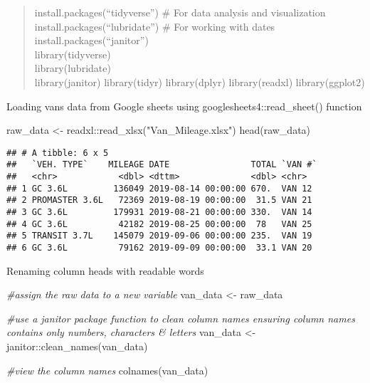 \documentclass[
]{article}
\newenvironment{Shaded}{\begin{snugshade}}{\end{snugshade}}
\newcommand{\CommentTok}[1]{\textcolor[rgb]{0.56,0.35,0.01}{\textit{#1}}}
\newcommand{\FunctionTok}[1]{\textcolor[rgb]{0.00,0.00,0.00}{#1}}
\newcommand{\NormalTok}[1]{#1}
\newcommand{\OtherTok}[1]{\textcolor[rgb]{0.56,0.35,0.01}{#1}}
\newcommand{\SpecialCharTok}[1]{\textcolor[rgb]{0.00,0.00,0.00}{#1}}
\newcommand{\StringTok}[1]{\textcolor[rgb]{0.31,0.60,0.02}{#1}}
\begin{document}
\begin{quote}
install.packages(``tidyverse'') \# For data analysis and visualization\\
install.packages(``lubridate'') \# For working with dates\\
install.packages(``janitor'')\\
library(tidyverse)\\
library(lubridate)\\
library(janitor) library(tidyr) library(dplyr) library(readxl)
library(ggplot2)
\end{quote}

Loading vans data from Google sheets using googlesheets4::read\_sheet()
function

\begin{Shaded}
\begin{Highlighting}[]
\NormalTok{raw\_data }\OtherTok{\textless{}{-}}\NormalTok{ readxl}\SpecialCharTok{::}\FunctionTok{read\_xlsx}\NormalTok{(}\StringTok{"Van\_Mileage.xlsx"}\NormalTok{)}
\FunctionTok{head}\NormalTok{(raw\_data)}
\end{Highlighting}
\end{Shaded}

\begin{verbatim}
## # A tibble: 6 x 5
##   `VEH. TYPE`    MILEAGE DATE                TOTAL `VAN #`
##   <chr>            <dbl> <dttm>              <dbl> <chr>  
## 1 GC 3.6L         136049 2019-08-14 00:00:00 670.  VAN 12 
## 2 PROMASTER 3.6L   72369 2019-08-19 00:00:00  31.5 VAN 21 
## 3 GC 3.6L         179931 2019-08-21 00:00:00 330.  VAN 14 
## 4 GC 3.6L          42182 2019-08-25 00:00:00  78   VAN 25 
## 5 TRANSIT 3.7L    145079 2019-09-06 00:00:00 235.  VAN 19 
## 6 GC 3.6L          79162 2019-09-09 00:00:00  33.1 VAN 20
\end{verbatim}

Renaming column heads with readable words

\begin{Shaded}
\begin{Highlighting}[]
\CommentTok{\#assign the raw data to a new variable}
\NormalTok{van\_data }\OtherTok{\textless{}{-}}\NormalTok{ raw\_data }

\CommentTok{\#use a janitor package function to clean column names ensuring column names contains only numbers, characters \& letters}
\NormalTok{van\_data }\OtherTok{\textless{}{-}}\NormalTok{ janitor}\SpecialCharTok{::}\FunctionTok{clean\_names}\NormalTok{(van\_data)}

\CommentTok{\#view the column names}
\FunctionTok{colnames}\NormalTok{(van\_data)}
\end{Highlighting}
\end{Shaded}
\end{document}
